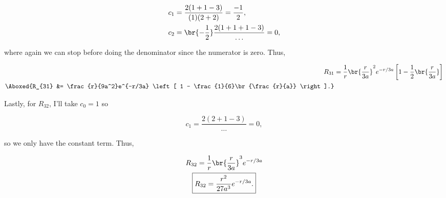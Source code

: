 \begin{align}
    c_1 &= \frac{2(1+1-3)}{(1)(2+2)} = \frac{-1}{2}, \\
    c_2 &= \br{-\frac{1}{2}}\frac{2(1+1+1-3)}{\ldots} = 0,
\end{align}

where again we can stop before doing the denominator since the numerator is zero. Thus,

\begin{align}
    R_{31} &= \frac{1}{r}\br{\frac{r}{3a}}^2 e^{-r/3a} \left[ 1 - \frac{1}{2}\br{\frac{r}{3a}} \right] \\
    \Aboxed{R_{31} &= \frac{r}{9a^2}e^{-r/3a} \left[ 1 - \frac{1}{6}\br{\frac{r}{a}} \right].}
\end{align}

Lastly, for $R_{32}$, I'll take $c_0=1$ so

\begin{equation}
    c_1 = \frac{2(2+1-3)}{\ldots} = 0,
\end{equation}

so we only have the constant term. Thus,

\begin{gather}
    R_{32} = \frac{1}{r}\br{\frac{r}{3a}}^3 e^{-r/3a} \\
    \boxed{R_{32} = \frac{r^2}{27a^3}e^{-r/3a}.}
\end{gather}

